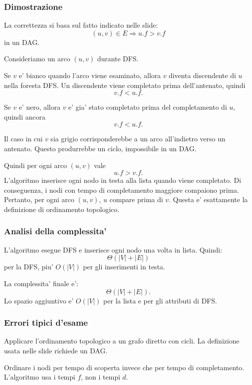 \subsubsection{Dimostrazione}
La correttezza si basa sul fatto indicato nelle slide:
\[
(u,v)\in E \Longrightarrow u.f>v.f
\]
in un DAG.

Consideriamo un arco $(u,v)$ durante DFS.

Se $v$ e' bianco quando l'arco viene esaminato, allora $v$ diventa discendente di $u$ nella foresta DFS. Un discendente viene completato prima dell'antenato, quindi
\[
v.f<u.f.
\]

Se $v$ e' nero, allora $v$ e' gia' stato completato prima del completamento di $u$, quindi ancora
\[
v.f<u.f.
\]

Il caso in cui $v$ sia grigio corrisponderebbe a un arco all'indietro verso un antenato. Questo produrrebbe un ciclo, impossibile in un DAG.

Quindi per ogni arco $(u,v)$ vale
\[
u.f>v.f.
\]
L'algoritmo inserisce ogni nodo in testa alla lista quando viene completato. Di conseguenza, i nodi con tempo di completamento maggiore compaiono prima. Pertanto, per ogni arco $(u,v)$, $u$ compare prima di $v$. Questa e' esattamente la definizione di ordinamento topologico.

\subsubsection{Analisi della complessita'}
L'algoritmo esegue DFS e inserisce ogni nodo una volta in lista. Quindi:
\[
\Theta(|V|+|E|)
\]
per la DFS, piu' $O(|V|)$ per gli inserimenti in testa.

La complessita' finale e':
\[
\Theta(|V|+|E|).
\]
Lo spazio aggiuntivo e' $O(|V|)$ per la lista e per gli attributi di DFS.

\subsubsection{Errori tipici d'esame}
\begin{hardnote}
Applicare l'ordinamento topologico a un grafo diretto con cicli. La definizione usata nelle slide richiede un DAG.
\end{hardnote}

\begin{hardnote}
Ordinare i nodi per tempo di scoperta invece che per tempo di completamento. L'algoritmo usa i tempi $f$, non i tempi $d$.
\end{hardnote}

